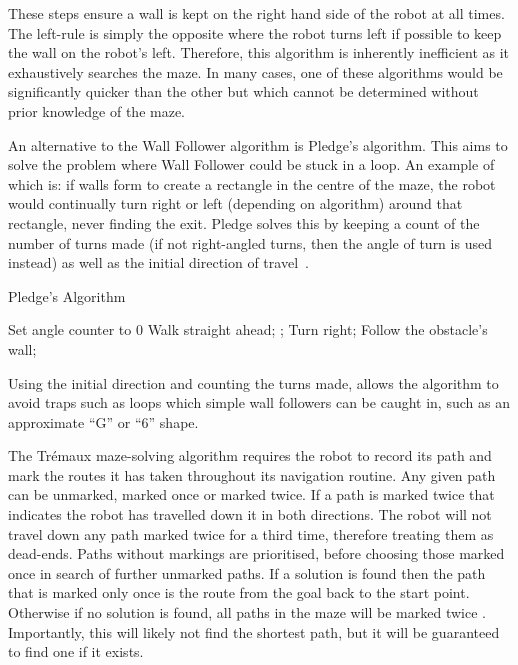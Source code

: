 These steps ensure a wall is kept on the right hand side of the robot at
all times. The left-rule is simply the opposite where the robot turns left
if possible to keep the wall on the robot's left. Therefore,
this algorithm is inherently inefficient as it exhaustively searches the
maze. In many cases, one of these algorithms would be significantly quicker
than the other but which cannot be determined without prior knowledge of
the maze.

An alternative to the Wall Follower algorithm is Pledge's algorithm. This
aims to solve the problem where Wall Follower could be stuck in a loop. An
example of which is: if walls form to create a rectangle in the centre of
the maze, the robot would continually turn right or left (depending on
algorithm) around that rectangle, never finding the exit. Pledge solves this
by keeping a count of the number of turns made (if not right-angled turns,
then the angle of turn is used instead) as well as the initial direction of
travel~\cite{klein2011pledge}.

\begin{algorithm}
\caption{Pledge's Algorithm}
\begin{algorithmic}
\STATE Set angle counter to 0
\REPEAT
\REPEAT
\STATE Walk straight ahead;
;
\STATE Turn right;
\REPEAT
\STATE Follow the obstacle's wall;
\end{algorithmic}
\end{algorithm}

Using the initial direction and counting the turns made, allows the
algorithm to avoid traps such as loops which simple wall followers can be caught in, such as an approximate ``G'' or ``6'' shape.

The Trémaux maze-solving algorithm requires the robot to record its
path and mark the routes it has taken throughout its navigation routine. Any
given path can be unmarked, marked once or marked twice. If a path is marked
twice that indicates the robot has travelled down it in both directions. The
robot will not travel down any path marked twice for a third time, therefore
treating them as dead-ends. Paths without markings are prioritised, before
choosing those marked once in search of further unmarked paths. If a
solution is found then the path that is marked only once is the route
from the goal back to the start point. Otherwise if no solution is found,
all paths in the maze will be marked twice \cite{even2011graph}.
Importantly, this will likely not find the shortest path, but it will be
guaranteed to find one if it exists.

